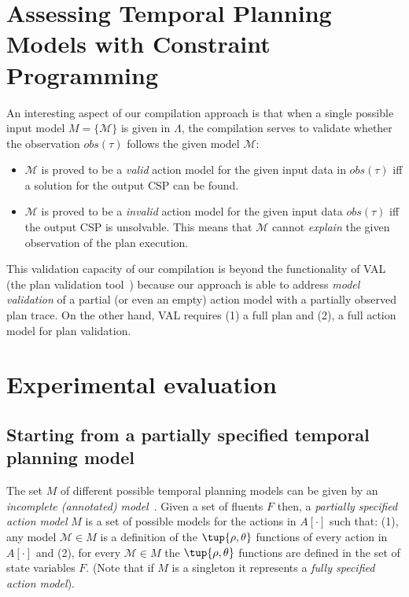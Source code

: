 \documentclass[runningheads]{llncs}
\begin{document}
\section{Assessing Temporal Planning Models with Constraint Programming}
An interesting aspect of our compilation approach is that when a single possible input model $M=\{\mathcal{M}\}$ is given in $\Lambda$, the compilation serves to validate whether the observation $obs(\tau)$ follows the given model $\mathcal{M}$:

\begin{itemize}
	\item $\mathcal{M}$ is proved to be a {\em valid} action model for the given input data in $obs(\tau)$ iff a solution for the output CSP can be found.
	\item $\mathcal{M}$ is proved to be a {\em invalid} action model for the given input data $obs(\tau)$ iff the output CSP is unsolvable. This means that $\mathcal{M}$ cannot {\em explain} the given observation of the plan execution.
\end{itemize}

This validation capacity of our compilation is beyond the functionality of VAL (the plan validation tool~\cite{howey2004val}) because our approach is able to address {\em model validation} of a partial (or even an empty) action model with a partially observed plan trace. On the other hand, VAL requires (1) a full plan and (2), a full action model for plan validation.

\section{Experimental evaluation}
\label{sec:evaluation}

\subsection{Starting from a partially specified temporal planning model}
The set $M$ of different possible temporal planning models can be given by an {\em incomplete (annotated) model}~\cite{sreedharan2018handling}. Given a set of fluents $F$ then, a {\em partially specified action model} $M$ is a set of possible models for the actions in $A[\cdot]$ such that: (1), any model $\mathcal{M}\in M$ is a definition of the $\tup{\rho,\theta}$ functions of every action in $A[\cdot]$ and (2), for every $\mathcal{M}\in M$ the $\tup{\rho,\theta}$ functions are defined in the set of state variables $F$. (Note that if $M$ is a singleton it represents a {\em fully specified action model}).
\end{document}
